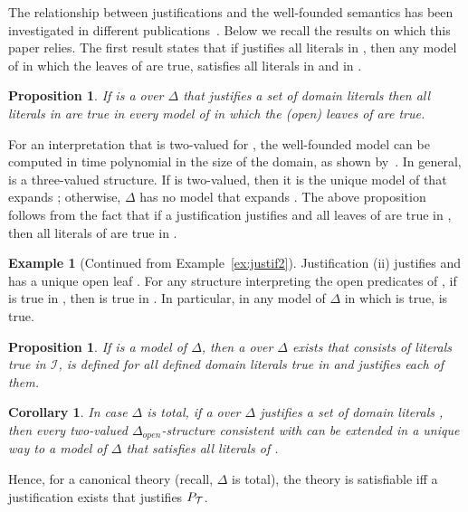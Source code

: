 \documentclass[11pt]{article}
\newcommand{\m}[1]{\ensuremath{#1}\xspace}
\newcommand{\I}{\m{\mathcal{I}}}
\newcommand{\theory}{\m{\mathcal{T}}}
\newcommand{\D}{\m{\Delta}}
\newcommand{\open}[1]{\m{#1_{open}}}
\theoremstyle{plain}
\newtheorem{corollary}[thm]{Corollary}
\newtheorem{proposition}[thm]{Proposition}
\theoremstyle{definition}
\theoremstyle{example_basic}
\newtheorem{example}[thm]{Example}
\theoremstyle{example_contd}
\theoremstyle{plain}
\newcommand{\pt}{\ensuremath{P_\text{\theory}}\xspace}
\newcommand{\change}[1]{#1}
\begin{document}
The relationship between justifications and the well-founded semantics has been investigated in different publications~\cite{DeneckerS93,Denecker92e,phd/Marien09}. Below we recall the results on which this paper relies. The first result states that if \jgraph justifies all literals in , then any model  of  in which the leaves of  are true, satisfies all literals in  and in .  

\begin{proposition}\label{prop:just}
If \jgraph is a \justification over \D that justifies a set of domain literals  then all literals in   are true in every model of  in which the (open) leaves of  are true. 
\end{proposition}

For an interpretation  that is two-valued for , the well-founded model  can be computed in time polynomial in the size of the domain, as shown by~. In general,  is a three-valued structure. If   is two-valued, then it is the unique model of  that expands ; otherwise, \D has no model that expands . The above proposition follows from the fact that if a justification \jgraph justifies  and all leaves of \jgraph are true in , then all literals of  are true in .

\begin{example}[Continued from Example~\ref{ex:justif2}]
\change{Justification (ii) justifies  and has a unique open leaf . For any structure  interpreting the open predicates of , if  is true in , then  is true in . In particular, in any model of \D in which  is true,  is true.}
\end{example}

\begin{proposition}\label{prop:justbis}
\change{If  is a model of \D, then a \justification \jgraph over \D exists that consists of literals true in \I, is defined for all defined domain literals true in  and justifies each of them.}
\end{proposition}

\begin{corollary}\label{cor:voila}
In case \D is total, if a \justification \jgraph over \D justifies a set of domain literals , then every two-valued \open{\D}-structure consistent with  can be extended in a unique way to a model of \D that satisfies all literals of . 
\end{corollary}
Hence, for a canonical theory  (recall, \D is total), the theory is satisfiable iff a justification \jgraph exists that justifies \pt. 
\end{document}
